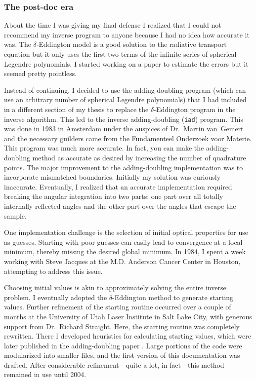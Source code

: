 \documentclass{article}
\newcommand\iadprog{\texttt{iad}}
\begin{document}
\subsubsection*{The post-doc era}
About the time I was giving my final defense I realized that I could not
recommend my inverse program to anyone because I had no idea how accurate it
was.  The $\delta$-Eddington model is a good solution to the radiative
transport equation but it only uses the first two terms of the infinite series
of spherical Legendre polynomials.  I started working on a paper to estimate the errors but it seemed pretty
pointless.  

Instead of continuing, I decided to use the adding-doubling program (which can use an arbitrary number of
spherical Legendre polynomials) that I had included in a different section of my thesis to replace the
$\delta$-Eddington program in the inverse algorithm. This
led to the inverse adding-doubling (\iadprog{}) program.  This was done in 1983 in Amsterdam
under the auspices of Dr.\ Martin van~Gemert and the necessary guilders came from the Fundamenteel
Onderzoek voor Materie.  This program was much more accurate.  In fact, you can
make the adding-doubling method as accurate as desired by increasing the number
of quadrature points.  The major improvement to the adding-doubling implementation was
to incorporate mismatched boundaries.  Initially my solution was curiously
inaccurate. Eventually, I realized that an
accurate implementation required breaking the angular integration into two parts: one part over 
all totally internally reflected angles and the other part over the angles that escape
the sample.

One implementation challenge is the selection of initial optical properties for use as guesses. 
Starting with poor guesses can easily lead to convergence at a local minimum, thereby missing the 
desired global minimum. In 1984, I spent a week working with Steve Jacques at the M.D. Anderson 
Cancer Center in Houston, attempting to address this issue.

Choosing initial values is akin to approximately solving the entire inverse problem. I eventually 
adopted the $\delta$-Eddington method to generate starting values. Further refinement of the 
starting routine occurred over a couple of months at the University of Utah Laser Institute in Salt 
Lake City, with generous support from Dr.\ Richard Straight. Here, the starting routine was 
completely rewritten.  There I developed heuristics for calculating starting values, which were later published in the adding-doubling paper \cite{prahl93a}. Large portions of the code were modularized into smaller files, and the first version of this documentation was drafted. After considerable refinement---quite a lot, in fact---this method remained in use until 2004.
\end{document}
